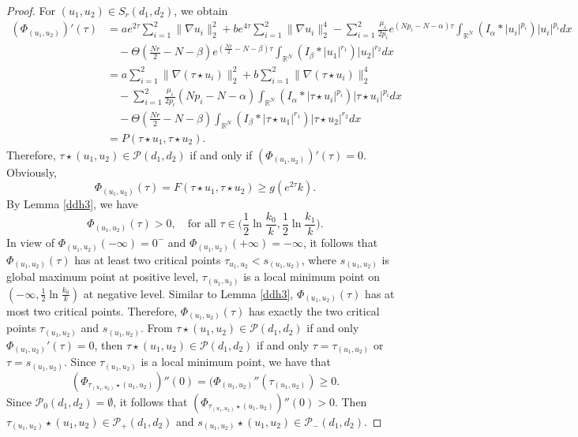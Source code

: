 \documentclass[reqno]{amsart}
\begin{document}
\begin{proof}
For  $(u_1,u_2)\in S_r(d_1,d_2)$, we obtain
\begin{align*}
(\Phi_{(u_1,u_2)})'(\tau)
&= ae^{2\tau}\sum_{i=1}^2\| \nabla u_i\|_2^2+be^{4\tau}\sum_{i=1}^2\| \nabla u_i\|_2^4
 -\sum_{i=1}^2\frac{\mu_i}{2p_i}e^{(Np_i-N-\alpha)\tau}\int_{\mathbb{R}^N}(I_\alpha\ast|u_i|^{p_i})|u_i|^{p_i}dx\\
&\quad -\Theta(\frac{Nr}{2}-N-\beta) e^{(\frac{Nr}{2}-N-\beta)\tau}
 \int_{\mathbb{R}^N}(I_\beta\ast|u_1|^{r_1})|u_2|^{r_2}dx\\
&= a\sum_{i=1}^2\| \nabla (\tau\star u_i)\|_2^2+b\sum_{i=1}^2
 \| \nabla (\tau\star u_i)\|_2^4 \\
&\quad -\sum_{i=1}^2 \frac{\mu_i}{2p_i}(Np_i-N-\alpha)
\int_{\mathbb{R}^N}(I_\alpha\ast|\tau\star u_i|^{p_i})|\tau\star u_i|^{p_i}dx\\
&\quad -\Theta(\frac{Nr}{2}-N-\beta)\int_{\mathbb{R}^N}(I_\beta\ast|\tau\star u_1|^{r_1})
|\tau\star u_2|^{r_2}dx\\
&= P(\tau\star u_1,\tau\star u_2).
\end{align*}
Therefore, $\tau\star(u_1,u_2)\in\mathcal{P}(d_1,d_2)$ if and only if 
$(\Phi_{(u_1,u_2)})'(\tau)=0$. Obviously,
\[
\Phi_{(u_1,u_2)}(\tau)=F(\tau\star u_1,\tau\star u_2)\geq g(e^{2\tau}k).
\]
By Lemma \ref{ddh3}, we have
\[
 \Phi_{(u_1,u_2)}(\tau)>0, \quad \text{for all }
 \tau\in\Big(\frac{1}{2}\ln\frac{k_0}{k},\frac{1}{2}\ln\frac{k_1}{k}\Big).
\]
In view of $\Phi_{(u_1,u_2)}(-\infty)=0^-$ and $\Phi_{(u_1,u_2)}(+\infty)=-\infty$,
it follows that $\Phi_{(u_1,u_2)}(\tau)$ has at least two critical points
$\tau_{u_1,u_2}<s_{(u_1,u_2)}$, where $s_{(u_1,u_2)}$ is global maximum point at
positive level, $\tau_{(u_1,u_2)}$ is a local minimum point on
$(-\infty,\frac{1}{2}\ln\frac{k_0}{k})$ at negative level.
Similar to Lemma \ref{ddh3}, $\Phi_{(u_1,u_2)}(\tau)$ has at most two critical points.
Therefore, $\Phi_{(u_1,u_2)}(\tau)$ has exactly the two critical points
$\tau_{(u_1,u_2)}$ and $s_{(u_1,u_2)}$.
From $\tau\star(u_1,u_2)\in\mathcal{P}(d_1,d_2)$ if and only
$\Phi_{(u_1,u_2)}'(\tau)=0$, then $\tau\star(u_1,u_2)\in\mathcal{P}(d_1,d_2)$
if and only $\tau=\tau_{(u_1,u_2)}$ or $\tau=s_{(u_1,u_2)}$.
Since $\tau_{(u_1,u_2)}$ is a local minimum point, we have that
\[
(\Phi_{\tau_{(u_1,u_2)}\star(u_1,u_2)})''(0)=(\Phi_{(u_1,u_2)}''(\tau_{(u_1,u_2)})\geq0.
\]
Since $\mathcal{P}_0(d_1,d_2)=\emptyset$, it follows that
 $(\Phi_{\tau_{(u_1,u_2)}\star(u_1,u_2)})''(0)>0$.
Then $\tau_{(u_1,u_2)}\star(u_1,u_2)\in\mathcal{P}_+(d_1,d_2)$
and $s_{(u_1,u_2)}\star(u_1,u_2)\in\mathcal{P}_-(d_1,d_2)$.

\end{proof}
\end{document}
